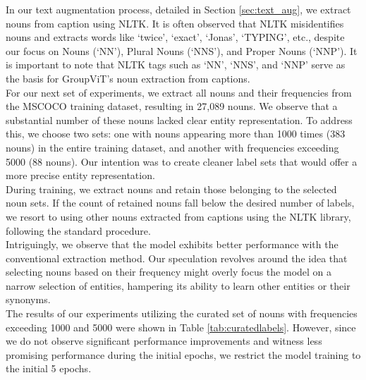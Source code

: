 In our text augmentation process, detailed in Section \ref{sec:text_aug}, we extract nouns from caption using NLTK. It is often observed that NLTK  misidentifies nouns and extracts words like `twice', `exact', `Jonas', `TYPING', etc., despite our focus on Nouns (`NN'), Plural Nouns (`NNS'), and Proper Nouns (`NNP'). It is important to note that NLTK tags such as `NN', `NNS', and `NNP' serve as the basis for GroupViT's noun extraction from captions.\\
For our next set of experiments, we extract all nouns and their frequencies from the MSCOCO training dataset, resulting in 27,089 nouns. We observe that a substantial number of these nouns lacked clear entity representation. To address this, we choose two sets: one with nouns appearing more than 1000 times (383 nouns) in the entire training dataset, and another with frequencies exceeding 5000 (88 nouns). Our intention was to create cleaner label sets that would offer a more precise entity representation.\\
During training, we extract nouns and retain those belonging to the selected noun sets. If the count of retained nouns fall below the desired number of labels, we resort to using other nouns extracted from captions using the NLTK library, following the standard procedure. \\
Intriguingly, we observe that the model exhibits better performance with the conventional extraction method. Our speculation revolves around the idea that selecting nouns based on their frequency might overly focus the model on a narrow selection of entities, hampering its ability to learn other entities or their synonyms.\\
The results of our experiments utilizing the curated set of nouns with frequencies exceeding 1000 and 5000 were shown in Table \ref{tab:curatedlabels}. However, since we do not observe significant performance improvements and witness less promising performance during the initial epochs, we restrict the model training to the initial 5 epochs.

